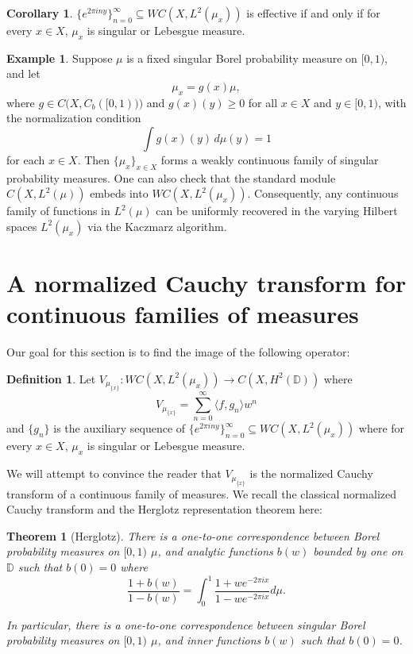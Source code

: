\documentclass[11pt]{amsart}
\newtheorem*{thm*}{Theorem}
\theoremstyle{definition}
\newtheorem{defn}[thm]{Definition}
\newtheorem{cor}{Corollary}[section]
\newtheorem{ex}[thm]{Example}
\numberwithin{equation}{section}
\begin{document}
\begin{cor}\label{contcor}
 $\{e^{2\pi i ny}\}_{n=0}^{\infty}\subseteq WC(X, L^{2}(\mu_{x}))$ is effective if and only if for every $x\in X$, $\mu_{x}$ is singular or Lebesgue measure.
\end{cor}

\begin{ex}
Suppose \( \mu \) is a fixed singular Borel probability measure on \([0,1)\), and let $$\mu_x = g(x)\mu,$$ where 
\( g \in C\big(X, C_b([0,1))\big) \) and \( g(x)(y) \geq 0 \) for all \( x \in X \) and \( y \in [0,1) \), with the normalization condition
\[
\int g(x)(y)\, d\mu(y) = 1
\]
for each \( x \in X \). Then \( \{ \mu_x \}_{x \in X} \) forms a weakly continuous family of singular probability measures. One can also check that the standard module \( C(X, L^2(\mu)) \) embeds into \( WC(X, L^2(\mu_x)) \). Consequently, any continuous family of functions in \( L^2(\mu) \) can be uniformly recovered in the varying Hilbert spaces \( L^2(\mu_x) \) via the Kaczmarz algorithm.
\end{ex}

\section{A normalized Cauchy transform for continuous families of measures}\label{S5}
Our goal for this section is to find the image of the following operator:
\begin{defn}
Let $V_{\mu_{\{x\}}}: WC(X, L^{2}(\mu_{x}))\to C(X, H^{2}(\mathbb{D}))$ where
$$V_{\mu_{\{x\}}}= \sum_{n=0}^{\infty}\langle f, g_{n}\rangle w^{n}$$
and $\{g_{n}\}$ is the auxiliary sequence of $\{e^{2\pi i ny}\}_{n=0}^{\infty}\subseteq WC(X, L^{2}(\mu_{x}))$ where for every $x\in X$, $\mu_{x}$ is singular or Lebesgue measure.   
\end{defn}
We will attempt to convince the reader that $V_{\mu_{\{x\}}}$ is the normalized Cauchy transform of a continuous family of measures.
We recall the classical normalized Cauchy transform and the Herglotz representation theorem here:
\begin{thm*}[Herglotz]
There is a one-to-one correspondence between Borel probability measures on $[0,1)$ $\mu$, and analytic functions $b(w)$ bounded by one on $\mathbb{D}$ such that $b(0)=0$ where
$$\frac{1+b(w)}{1-b(w)}=\int_{0}^{1}\frac{1+we^{-2\pi i x}}{1-we^{-2\pi i x}}d\mu.$$

In particular, there is a one-to-one correspondence between singular Borel probability measures on $[0,1)$ $\mu$, and inner functions $b(w)$ such that $b(0)=0$.
\end{thm*}
\end{document}
